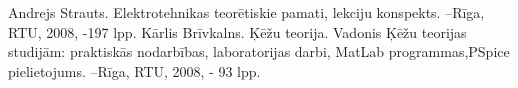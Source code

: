 \documentclass{report}
\begin{document}
\begin{thebibliography}{9}
Andrejs Strauts. Elektrotehnikas teorētiskie pamati, lekciju konspekts. –Rīga,
RTU, 2008, -197 lpp.
Kārlis Brīvkalns. Ķēžu teorija. Vadonis Ķēžu teorijas studijām: praktiskās
nodarbības, laboratorijas darbi, MatLab programmas,PSpice pielietojums. –Rīga,
RTU, 2008, - 93 lpp.
\end{thebibliography}
\end{document}
